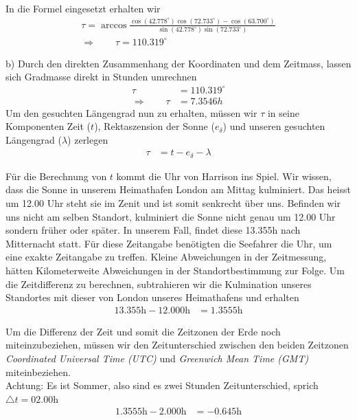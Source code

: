\begin{refsection}
In die Formel eingesetzt erhalten wir
\begin{align*}
\tau = \arccos 
\frac{ \cos(42.778^{\circ}) \cos(72.733^{\circ}) - \cos(63.700^{\circ})} {\sin(42.778^{\circ})\sin(72.733^{\circ})} \\
\Rightarrow \quad \quad
\tau = 110.319^{\circ} 
\end{align*}

b) \quad  Durch den direkten Zusammenhang der Koordinaten und dem Zeitmass, lassen sich Gradmasse direkt in Stunden umrechnen
\begin{align*}
\tau &= 110.319^{\circ} \\
\Rightarrow \quad \quad
\tau &= 7.3546h
\end{align*}
Um den gesuchten Längengrad nun zu erhalten, müssen wir $\tau$ in seine Komponenten Zeit ($t$), Rektaszension der Sonne ($e_\delta$) und unseren gesuchten Längengrad ($\lambda$) zerlegen
\begin{align*}
\tau &= t - e_\delta - \lambda 
\end{align*}


Für die Berechnung von $t$ kommt die Uhr von Harrison ins Spiel. Wir wissen, dass die Sonne in unserem Heimathafen London am Mittag kulminiert. Das heisst um 12.00 Uhr steht sie im Zenit und ist somit senkrecht über uns. 
Befinden wir uns nicht am selben Standort, kulminiert die Sonne nicht genau um 12.00 Uhr sondern früher oder später.
In unserem Fall, findet diese 13.355h nach Mitternacht statt. Für diese Zeitangabe benötigten die Seefahrer die Uhr, um eine exakte Zeitangabe zu treffen. Kleine Abweichungen in der Zeitmessung, hätten Kilometerweite Abweichungen in der Standortbestimmung zur Folge.
Um die Zeitdifferenz zu berechnen, subtrahieren wir die Kulmination unseres Standortes mit dieser von London unseres Heimathafens und erhalten
\begin{align*}
13.355 \text{h} - 12.000 \text{h} &= 1.3555 \text{h}
\end{align*}

Um die Differenz der Zeit und somit die Zeitzonen der Erde noch miteinzubeziehen, müssen wir den Zeitunterschied zwischen den beiden Zeitzonen \textit{Coordinated Universal Time (UTC)} und \textit{Greenwich Mean Time (GMT)} miteinbeziehen. \\
Achtung: Es ist Sommer, also sind es zwei Stunden Zeitunterschied, sprich $\triangle{t}=02.00$h
\begin{align*}
1.3555 \text{h} - 2.000 \text{h} &= -0.645 \text{h}
\end{align*}


\end{refsection}
